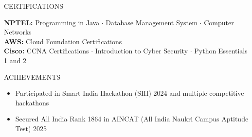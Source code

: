 \documentclass{resume}
\begin{document}
\begin{rSection}{CERTIFICATIONS}

\textbf{NPTEL:} Programming in Java $\cdot$ Database Management System $\cdot$ Computer Networks \\[1pt]
\textbf{AWS:} Cloud Foundation Certifications \\[1pt]
\textbf{Cisco:} CCNA Certifications $\cdot$ Introduction to Cyber Security $\cdot$ Python Essentials 1 and 2

\end{rSection}

\begin{rSection}{ACHIEVEMENTS}

\begin{itemize}[leftmargin=12pt, itemsep=0pt, label={\small$\bullet$}]
\item Participated in Smart India Hackathon (SIH) 2024 and multiple competitive hackathons
\item Secured All India Rank 1864 in AINCAT (All India Naukri Campus Aptitude Test) 2025
\end{itemize}

\end{rSection}
\end{document}
